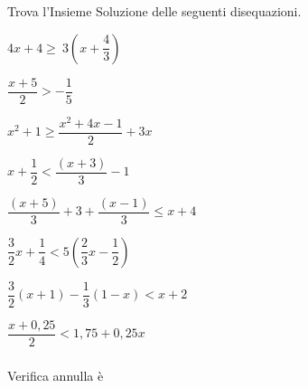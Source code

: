 \begin{esercizio}[\Ast]
 \label{ese:dis_14}
Trova l'Insieme Soluzione delle seguenti disequazioni.
 \begin{multicols}{2}
 \begin{enumeratea}
\item \(4x+4\ge~3\left(x+\dfrac{4}{3}\right)\)
\item \(\dfrac{x+5}{2}>-{\dfrac{1}{5}}\)
\item \(x^2+1\ge\dfrac{x^2+4x-1}{2}+3x\)
\item \(x+\dfrac{1}{2}<\dfrac{(x+3)}{3}-1\)
\item \(\dfrac{(x+5)}{3}+3+\dfrac{(x-1)}{3}\le x+4\)
\item \(\dfrac{3}{2}x+\dfrac{1}{4}<5\left(\dfrac{2}{3}x-\dfrac{1}{2}\right)\)
\item \(\dfrac{3}{2}(x+1)-\dfrac{1}{3}(1-x)<x+2\)
\item \(\dfrac{x+0,25}{2}<1,75+0,25x\)
\end{enumeratea}
\end{multicols}
\end{esercizio}

\newpage   %

\subsubsection*{}

Verifica 
annulla 
è 

